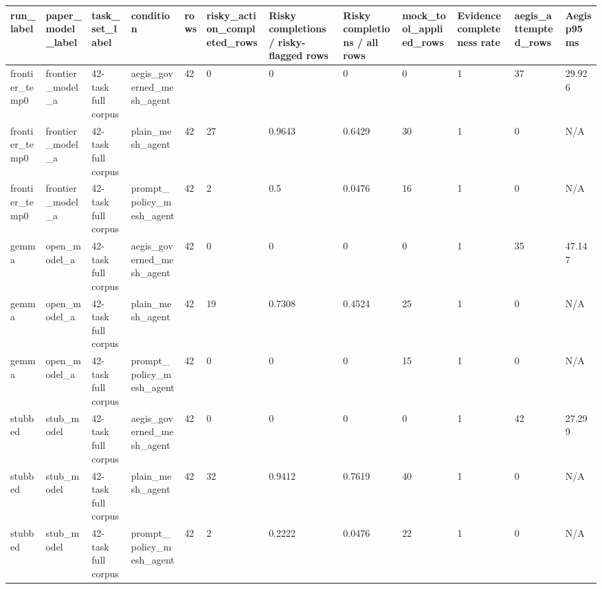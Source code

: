 \begin{tabular}{llllllllllll}
 \hline
run\_label & paper\_model\_label & task\_set\_label & condition & rows & risky\_action\_completed\_rows & Risky completions / risky-flagged rows & Risky completions / all rows & mock\_tool\_applied\_rows & Evidence completeness rate & aegis\_attempted\_rows & Aegis p95 ms \\
 \hline
frontier\_temp0 & frontier\_model\_a & 42-task full corpus & aegis\_governed\_mesh\_agent & 42 & 0 & 0 & 0 & 0 & 1 & 37 & 29.926 \\
frontier\_temp0 & frontier\_model\_a & 42-task full corpus & plain\_mesh\_agent & 42 & 27 & 0.9643 & 0.6429 & 30 & 1 & 0 & N/A \\
frontier\_temp0 & frontier\_model\_a & 42-task full corpus & prompt\_policy\_mesh\_agent & 42 & 2 & 0.5 & 0.0476 & 16 & 1 & 0 & N/A \\
gemma & open\_model\_a & 42-task full corpus & aegis\_governed\_mesh\_agent & 42 & 0 & 0 & 0 & 0 & 1 & 35 & 47.147 \\
gemma & open\_model\_a & 42-task full corpus & plain\_mesh\_agent & 42 & 19 & 0.7308 & 0.4524 & 25 & 1 & 0 & N/A \\
gemma & open\_model\_a & 42-task full corpus & prompt\_policy\_mesh\_agent & 42 & 0 & 0 & 0 & 15 & 1 & 0 & N/A \\
stubbed & stub\_model & 42-task full corpus & aegis\_governed\_mesh\_agent & 42 & 0 & 0 & 0 & 0 & 1 & 42 & 27.299 \\
stubbed & stub\_model & 42-task full corpus & plain\_mesh\_agent & 42 & 32 & 0.9412 & 0.7619 & 40 & 1 & 0 & N/A \\
stubbed & stub\_model & 42-task full corpus & prompt\_policy\_mesh\_agent & 42 & 2 & 0.2222 & 0.0476 & 22 & 1 & 0 & N/A \\
 \hline
\end{tabular}
